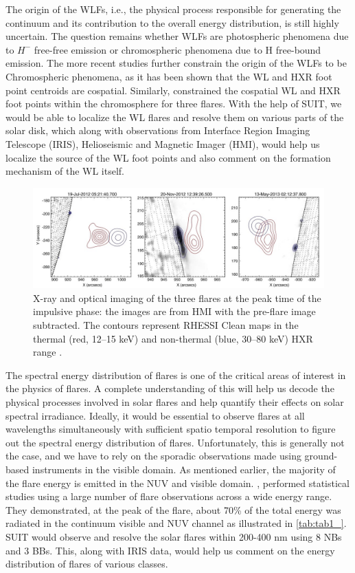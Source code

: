 The origin of the WLFs, i.e., the physical process responsible for generating the continuum and its contribution to the overall energy distribution, is still highly uncertain. The question remains whether WLFs are photospheric phenomena due to $H^{-}$ free-free emission or chromospheric phenomena due to H free-bound emission. The more recent studies further constrain the origin of the WLFs to be Chromospheric phenomena, as it has been shown that the WL and HXR foot point centroids are cospatial. Similarly, \cite{krucker15} constrained the cospatial WL and HXR foot points within the chromosphere for three flares. With the help of SUIT, we would be able to localize the WL flares and resolve them on various parts of the solar disk, which along with observations from Interface Region Imaging Telescope (IRIS), Helioseismic and Magnetic Imager (HMI), would help us localize the source of the WL foot points and also comment on the formation mechanism of the WL itself.

\begin{figure}[ht!]
    \centering
    \includegraphics[width = \linewidth]{Figures/Krucker_2015_ApJ_802_19_page-0004.jpg}
    \caption[X-ray and optical imaging of the three flares at the peak of the flare.]{X-ray and optical imaging of the three flares at the peak time of the impulsive phase: the images are from HMI with the pre-flare image subtracted. The contours represent RHESSI Clean maps in the thermal (red, 12–15 keV) and non-thermal (blue, 30–80 keV) HXR range \citep{krucker15}.}
    \label{fig1}
\end{figure}

The spectral energy distribution of flares is one of the critical areas of interest in the physics of flares. A complete understanding of this will help us decode the physical processes involved in solar flares and help quantify their effects on solar spectral irradiance. Ideally, it would be essential to observe flares at all wavelengths simultaneously with sufficient spatio temporal resolution to figure out the spectral energy distribution of flares. Unfortunately, this is generally not the case, and we have to rely on the sporadic observations made using ground-based instruments in the visible domain. As mentioned earlier, the majority of the flare energy is emitted in the NUV and visible domain. \cite{kretzschmar10,kretzschmar11}, performed statistical studies using a large number of flare observations across a wide energy range. They demonstrated, at the peak of the flare, about 70\% of the total energy was radiated in the continuum visible and NUV channel as illustrated in \ref{tab:tab1_}. SUIT would observe and resolve the solar flares within 200-400 nm using 8 NBs and 3 BBs. This, along with IRIS data, would help us comment on the energy distribution of flares of various classes.

